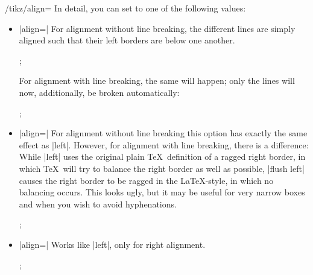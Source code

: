 \begin{key}{/tikz/align=}
    In detail, you can set  to one of the following values:
    \begin{itemize}
        \item |align=| For alignment without line breaking,
            the different lines are simply aligned such that their left borders
            are below one another.
\begin{codeexample}[]
\tikz {};
\end{codeexample}
            For alignment with line breaking, the same will happen; only the
            lines will now, additionally, be broken automatically:
\begin{codeexample}[]
\tikz {};
\end{codeexample}
        \item |align=| For alignment without line
            breaking this option has exactly the same effect as |left|.
            However, for alignment with line breaking, there is a difference:
            While |left| uses the original plain \TeX\ definition of a ragged
            right border, in which \TeX\ will try to balance the right border
            as well as possible, |flush left| causes the right border to be
            ragged in the \LaTeX-style, in which no balancing occurs. This
            looks ugly, but it may be useful for very narrow boxes and when you
            wish to avoid hyphenations.
\begin{codeexample}[]
\tikz {};
\end{codeexample}
        \item |align=| Works like |left|, only for right
            alignment.
\begin{codeexample}[]
\tikz {};
\end{codeexample}
\begin{codeexample}[]

\end{codeexample}
\end{itemize}
\end{key}
